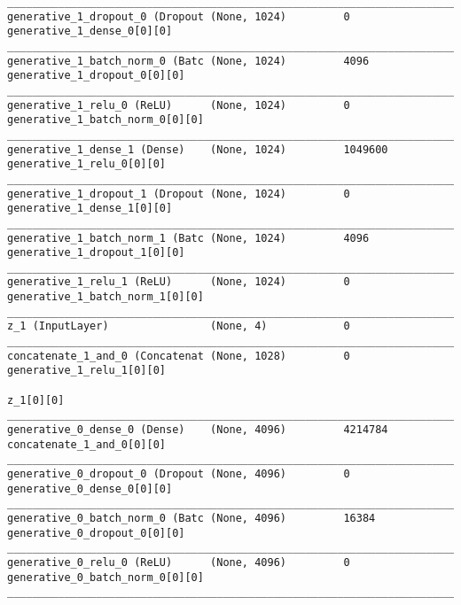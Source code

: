 \begin{lstlisting}[caption={dSprites-\ac{VLAE} Decoder},captionpos=b,basicstyle=\tiny, label={lst:dsprites-vlae-decoder}]
__________________________________________________________________________________________________
generative_1_dropout_0 (Dropout (None, 1024)         0           generative_1_dense_0[0][0]
__________________________________________________________________________________________________
generative_1_batch_norm_0 (Batc (None, 1024)         4096        generative_1_dropout_0[0][0]
__________________________________________________________________________________________________
generative_1_relu_0 (ReLU)      (None, 1024)         0           generative_1_batch_norm_0[0][0]
__________________________________________________________________________________________________
generative_1_dense_1 (Dense)    (None, 1024)         1049600     generative_1_relu_0[0][0]
__________________________________________________________________________________________________
generative_1_dropout_1 (Dropout (None, 1024)         0           generative_1_dense_1[0][0]
__________________________________________________________________________________________________
generative_1_batch_norm_1 (Batc (None, 1024)         4096        generative_1_dropout_1[0][0]
__________________________________________________________________________________________________
generative_1_relu_1 (ReLU)      (None, 1024)         0           generative_1_batch_norm_1[0][0]
__________________________________________________________________________________________________
z_1 (InputLayer)                (None, 4)            0
__________________________________________________________________________________________________
concatenate_1_and_0 (Concatenat (None, 1028)         0           generative_1_relu_1[0][0]
                                                                 z_1[0][0]
__________________________________________________________________________________________________
generative_0_dense_0 (Dense)    (None, 4096)         4214784     concatenate_1_and_0[0][0]
__________________________________________________________________________________________________
generative_0_dropout_0 (Dropout (None, 4096)         0           generative_0_dense_0[0][0]
__________________________________________________________________________________________________
generative_0_batch_norm_0 (Batc (None, 4096)         16384       generative_0_dropout_0[0][0]
__________________________________________________________________________________________________
generative_0_relu_0 (ReLU)      (None, 4096)         0           generative_0_batch_norm_0[0][0]
__________________________________________________________________________________________________

\end{lstlisting}
